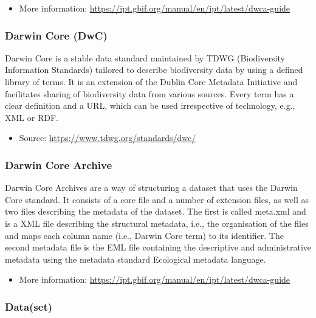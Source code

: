\documentclass[
  oneside]{book}
\providecommand{\tightlist}{%
  \setlength{\itemsep}{0pt}\setlength{\parskip}{0pt}}
\begin{document}
\begin{itemize}
\tightlist
\item
  More information: \url{https://ipt.gbif.org/manual/en/ipt/latest/dwca-guide}
\end{itemize}

\subsubsection*{Darwin Core (DwC)}\label{DwC}

Darwin Core is a stable data standard maintained by TDWG (Biodiversity Information Standards) tailored to describe biodiversity data by using a defined library of terms. It is an extension of the Dublin Core Metadata Initiative and facilitates sharing of biodiversity data from various sources. Every term has a clear definition and a URL, which can be used irrespective of technology, e.g., XML or RDF.

\begin{itemize}
\tightlist
\item
  Source: \url{https://www.tdwg.org/standards/dwc/}
\end{itemize}

\subsubsection*{Darwin Core Archive}\label{DwC-A}

Darwin Core Archives are a way of structuring a dataset that uses the Darwin Core standard. It consists of a core file and a number of extension files, as well as two files describing the metadata of the dataset. The first is called meta.xml and is a XML file describing the structural metadata, i.e., the organisation of the files and maps each column name (i.e., Darwin Core term) to its identifier. The second metadata file is the EML file containing the descriptive and administrative metadata using the metadata standard Ecological metadata language.

\begin{itemize}
\tightlist
\item
  More information: \url{https://ipt.gbif.org/manual/en/ipt/latest/dwca-guide}
\end{itemize}

\subsubsection*{Data(set)}\label{dataset}
\end{document}
